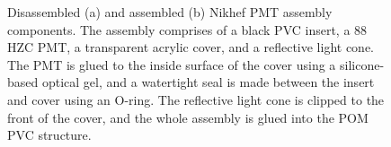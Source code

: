 \begin{figure} %
    \centering
    \quad
    \caption[Disassembled and assembled Nikhef PMT housing components]
    {Disassembled (a) and assembled (b) Nikhef PMT assembly components. The assembly comprises of
        a black PVC insert, a \unit{88}{} HZC PMT, a transparent acrylic cover, and a
        reflective light cone. The PMT is glued to the inside surface of the cover using a
        silicone-based optical gel, and a watertight seal is made between the insert and cover
        using an O-ring. The reflective light cone is clipped to the front of the cover, and the
        whole assembly is glued into the POM PVC structure.}
    \label{fig:nikhef_pmt_assembly}
\end{figure}

